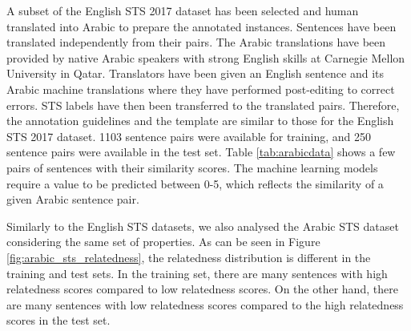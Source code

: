 \begin{enumerate}
A subset of the English STS 2017 dataset has been selected and human translated into Arabic to prepare the annotated instances. Sentences have been translated independently from their pairs. The Arabic translations have been provided by native Arabic speakers with strong English skills at Carnegie Mellon University in Qatar. Translators have been given an English sentence and its Arabic machine translations where they have performed post-editing to correct errors. STS labels have then been transferred to the translated pairs. Therefore, the annotation guidelines and the template are similar to those for the English STS 2017 dataset. 1103 sentence pairs were available for training, and 250 sentence pairs were available in the test set. Table \ref{tab:arabicdata} shows a few pairs of sentences with their similarity scores. The machine learning models require a value to be predicted between 0-5, which reflects the similarity of a given Arabic sentence pair. 



Similarly to the English STS datasets, we also analysed the Arabic STS dataset considering the same set of properties. As can be seen in Figure \ref{fig:arabic_sts_relatedness}, the relatedness distribution is different in the training and test sets. In the training set, there are many sentences with high relatedness scores compared to low relatedness scores. On the other hand,  there are many sentences with low relatedness scores compared to the high relatedness scores in the test set.



\end{enumerate}
